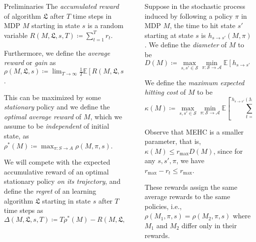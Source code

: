 \documentclass[final]{beamer}
\newcommand{\Exp}{\mathbb{E}}
\newlength{\sepwidth}
\newlength{\colwidth}
\newcommand{\separatorcolumn}{\begin{column}{\sepwidth}\end{column}}
\begin{document}
\begin{frame}[t]
\begin{columns}[t]
\begin{column}{\colwidth}
\begin{block}{Preliminaries}
    The \textit{accumulated reward} of algorithm $\mathfrak{L}$ after $T$ time steps in MDP $M$ starting in state $s$ is a random variable $R(M, \mathfrak{L}, s, T) \coloneqq \sum_{t=1}^T r_t$.
  
    Furthermore, we define the \textit{average reward} or \textit{gain} as $\rho(M, \mathfrak{L}, s) \coloneqq \lim_{T \rightarrow \infty} \frac{1}{T} \Exp \left[ R(M, \mathfrak{L}, s, T) \right]$.
    
    This can be maximized by some \textit{stationary} policy and we define the \textit{optimal average reward} of $M$, which we assume to be \textit{independent} of initial state, as $\rho^*(M) \coloneqq \max_{\pi : S \rightarrow A} \rho(M, \pi, s)$.
    
    We will compete with the expected accumulative reward of an optimal stationary policy \textit{on its trajectory}, and define the \textit{regret} of an learning algorithm $\mathfrak{L}$ starting in state $s$ after $T$ time steps as
    $$ \Delta(M, \mathfrak{L}, s, T) \coloneqq T \rho^*(M) - R(M, \mathfrak{L}, s, T). $$
 
  \end{block}

\end{column}

\separatorcolumn

\begin{column}{\colwidth}

  Suppose in the stochastic process induced by following a policy $\pi$ in MDP $M$, the time to hit state $s'$ starting at state $s$ is $h_{s \rightarrow s'}(M, \pi)$. We define the \emph{diameter} of $M$ \cite{jaksch2010near} to be
  $$ D(M) \coloneqq \max_{s, s' \in \mathcal{S}} \min_{\pi : \mathcal{S} \rightarrow \mathcal{A}} \Exp \left[ h_{s \rightarrow s'}(M, \pi) \right]. $$
  
  We define the \emph{maximum expected hitting cost} of $M$ to be
  $$ \kappa(M) \coloneqq \max_{s, s' \in \mathcal{S}} \min_{\pi : \mathcal{S} \rightarrow \mathcal{A}} \Exp \left[ \sum_{t=0}^{h_{s \rightarrow s'}(M, \pi) - 1} r_\text{max} - r_t \right]. $$
  
  Observe that MEHC is a smaller parameter, that is, $\kappa(M) \leq r_\text{max} D(M)$, since for any $s, s', \pi$, we have $r_\text{max} - r_t \leq r_\text{max}$.
  
  These rewards assign the same average rewards to the same policies, i.e., $\rho(M_1, \pi, s) = \rho(M_2, \pi, s)$ where $M_1$ and $M_2$ differ only in their rewards.
  

\end{column}
\end{columns}
\end{frame}
\end{document}
